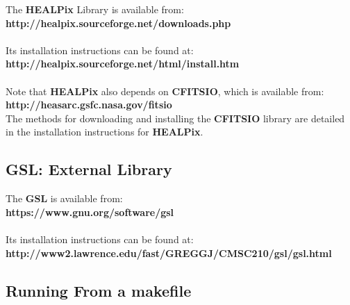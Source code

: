 \documentclass[12]{article}
\begin{document}
The {\bf HEALPix} Library is available from: \\ {\bf http://healpix.sourceforge.net/downloads.php} \\
\\
Its installation instructions can be found at: \\{\bf http://healpix.sourceforge.net/html/install.htm}
\\ \\
Note that {\bf HEALPix} also depends on {\bf CFITSIO}, which is available from: \\
{\bf  	http://heasarc.gsfc.nasa.gov/fitsio} \\ The methods for downloading and installing the {\bf CFITSIO} library are detailed in the installation instructions for {\bf HEALPix}.

\subsection{GSL: External Library}

The {\bf GSL} is available from: \\ {\bf https://www.gnu.org/software/gsl } \\
\\
Its installation instructions can be found at: \\ {\bf http://www2.lawrence.edu/fast/GREGGJ/CMSC210/gsl/gsl.html}

\subsection{Running From a makefile}
\end{document}
